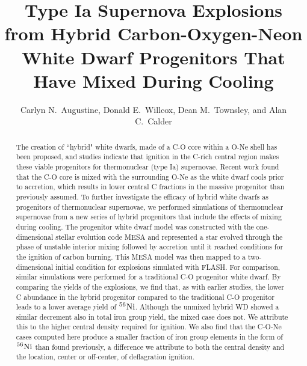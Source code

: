 \documentclass[iop,apj]{emulateapj}
\newcommand{\Ni}[1]{\ensuremath{{}^{#1}{\rm Ni}}}
\newcommand{\code}[1]{\textsc{#1}}
\newcommand{\FLASH}{\code{FLASH}}
\begin{document}
\title{Type Ia Supernova Explosions from Hybrid Carbon-Oxygen-Neon White
Dwarf Progenitors That Have Mixed During Cooling}

\author{
Carlyn N.\ Augustine,
Donald E.\ Willcox,
Dean M.\ Townsley,
and Alan C.\ Calder
}


\begin{abstract}
The creation of ``hybrid" white dwarfs, made of a C-O
core within a O-Ne shell has been proposed, and studies indicate that
ignition in the C-rich central region makes these
viable progenitors for thermonuclear (type Ia) supernovae.
Recent work found that the C-O core is mixed with the surrounding O-Ne
as the white dwarf cools prior to accretion, which results in lower central
C fractions in the massive progenitor than previously assumed. To further
investigate the efficacy of hybrid white dwarfs as progenitors of
thermonuclear supernovae, we performed simulations of thermonuclear
supernovae from a new series of hybrid progenitors that include the
effects of mixing during cooling. The progenitor white dwarf model
was constructed with the one-dimensional stellar evolution code MESA and
represented a star evolved through the phase of unstable interior mixing
followed by accretion until it reached conditions for the ignition of
carbon burning. This MESA model was then mapped to a two-dimensional initial
condition for explosions simulated with \FLASH. For comparison, similar
simulations were performed for a traditional C-O progenitor
white dwarf. By comparing the yields of the explosions, we find that, as
with earlier studies, the lower C abundance in the hybrid progenitor compared
to the traditional C-O progenitor leads to a lower average yield of \Ni{56}.
Although the unmixed hybrid WD showed a similar decrement also in total iron
group yield, the mixed case does not.  We attribute this to the higher
central density required for ignition.
We also find that the C-O-Ne cases computed here produce a smaller fraction of iron group elements in the form of \Ni{56} than found previously,
a difference we attribute to both the central density and the location, center or off-center, of deflagration ignition.
\end{abstract}
\end{document}
